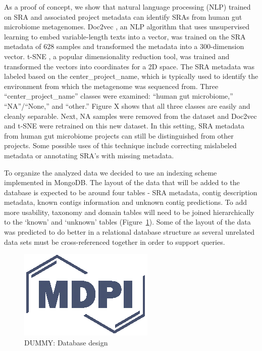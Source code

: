 \documentclass[genes, moreauthors]{Definitions/mdpi}
\begin{document}
  As a proof of concept, we show that natural language processing (NLP) trained
  on SRA and associated project metadata can identify SRAs from human gut
  microbiome metagenomes. Doc2vec \cite{Le2014}, an NLP algorithm that uses
  unsupervised
  learning to embed variable-length texts into a vector, was trained on the SRA
  metadata of 628 samples and transformed the metadata into a 300-dimension
  vector. t-SNE \cite{vanDerMaaten2008}, a popular dimensionality reduction tool, was trained and
  transformed the vectors into coordinates for a 2D space. The SRA metadata was
  labeled based on the center\_project\_name, which is typically used to identify
  the environment from which the metagenome was sequenced from. Three
  “center\_project\_name” classes were examined: “human gut microbiome,”
  “NA”/“None,” and “other.” Figure X shows that all three classes are easily
  and cleanly separable. Next, NA samples were removed from the dataset and
  Doc2vec and t-SNE were retrained on this new dataset. In this setting, SRA
  metadata from human gut microbiome projects can still be distinguished from
  other projects. Some possible uses of this technique include correcting
  mislabeled metadata or annotating SRA’s with missing metadata.

  To organize the analyzed data we decided to use an indexing scheme
  implemented in MongoDB. The layout of the data that will be added to the
  database is expected to be around four tables - SRA metadata, contig
  description metadata, known contigs information and unknown contig
  predictions. To add more usability, taxonomy and domain tables will need to
  be joined hierarchically to the ‘known’ and ‘unknown’ tables
  (Figure~\ref{fig:db_design}). Some of the layout of the data was predicted to
  do better in a relational database structure as several unrelated data sets
  must be cross-referenced together in order to support queries.

  \begin{figure}
    \centering
    \includegraphics{Definitions/logo-mdpi}
    \caption{DUMMY: Database design
            \label{fig:db_design}}
  \end{figure}
\end{document}
